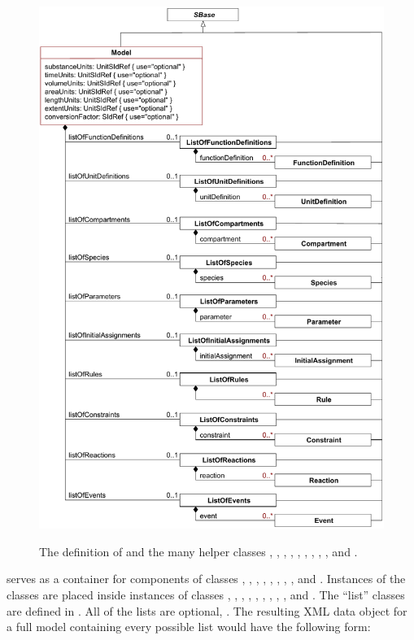 \begin{figure}[htbp]
             {\includegraphics[scale=0.75]{figs/model-uml}}
  \caption{The definition of \Model and the many helper
      classes \ListOfFunctionDefinitions, \ListOfUnitDefinitions,
      \ListOfCompartments, \ListOfSpecies, \ListOfParameters,
      \ListOfInitialAssignments, \ListOfRules, \ListOfConstraints,
      \ListOfReactions, and \ListOfEvents.}
  \label{fig:model}
\end{figure}

\Model serves as a container for components of classes
\FunctionDefinition, \UnitDefinition, \Compartment, \Species, \Parameter,
\InitialAssignment, \Rule, \Constraint, \Reaction and \Event.
Instances of the classes are placed inside instances of classes
\ListOfFunctionDefinitions, \ListOfUnitDefinitions,
\ListOfCompartments, \ListOfSpecies, \ListOfParameters, \ListOfInitialAssignments,
\ListOfRules, \ListOfConstraints, \ListOfReactions, and
\ListOfEvents.  The ``list'' classes are defined in
.  All of the lists are optional, .  The
resulting XML data object for a full model containing every
possible list would have the following form:

